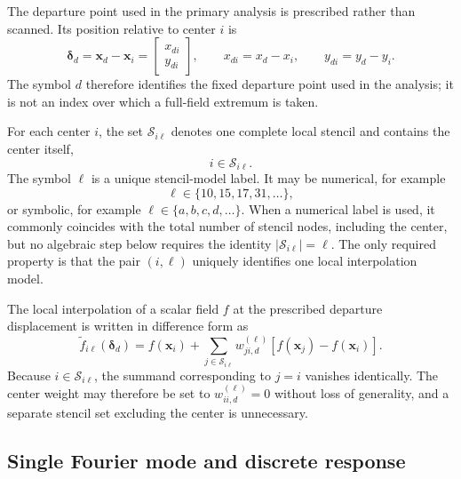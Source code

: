 \documentclass[11pt]{article}
\numberwithin{equation}{section}
\begin{document}
The departure point used in the primary analysis is prescribed rather than scanned. Its position relative to center $i$ is
\begin{equation}
    \bm{\delta}_d
    =
    \bm{x}_d-\bm{x}_i
    =
    \begin{bmatrix}
        x_{di}\\[1mm]
        y_{di}
    \end{bmatrix},
    \qquad
    x_{di}=x_d-x_i,
    \qquad
    y_{di}=y_d-y_i.
    \label{eq:departure-displacement}
\end{equation}
The symbol $d$ therefore identifies the fixed departure point used in the analysis; it is not an index over which a full-field extremum is taken.

For each center $i$, the set $\mathcal S_{i\ell}$ denotes one complete local stencil and contains the center itself,
\begin{equation}
    i\in\mathcal S_{i\ell}.
    \label{eq:center-in-stencil}
\end{equation}
The symbol $\ell$ is a unique stencil-model label. It may be numerical, for example
\begin{equation}
    \ell\in\{10,15,17,31,\ldots\},
    \label{eq:numerical-stencil-labels}
\end{equation}
or symbolic, for example $\ell\in\{a,b,c,d,\ldots\}$. When a numerical label is used, it commonly coincides with the total number of stencil nodes, including the center, but no algebraic step below requires the identity $|\mathcal S_{i\ell}|=\ell$. The only required property is that the pair $(i,\ell)$ uniquely identifies one local interpolation model.

The local interpolation of a scalar field $f$ at the prescribed departure displacement is written in difference form as
\begin{equation}
    \widetilde f_{i\ell}\!\left(\bm{\delta}_d\right)
    =
    f\!\left(\bm{x}_i\right)
    +
    \sum_{j\in\mathcal S_{i\ell}}
    w_{ji,d}^{(\ell)}
    \left[
        f\!\left(\bm{x}_j\right)
        -
        f\!\left(\bm{x}_i\right)
    \right].
    \label{eq:interpolation-operator}
\end{equation}
Because $i\in\mathcal S_{i\ell}$, the summand corresponding to $j=i$ vanishes identically. The center weight may therefore be set to $w_{ii,d}^{(\ell)}=0$ without loss of generality, and a separate stencil set excluding the center is unnecessary.

\subsection{Single Fourier mode and discrete response}
\end{document}
